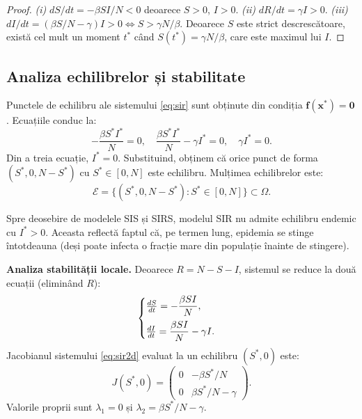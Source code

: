 \begin{proof}
\textit{(i)} $dS/dt = -\beta SI/N < 0$ deoarece $S > 0$, $I > 0$.
\textit{(ii)} $dR/dt = \gamma I > 0$.
\textit{(iii)} $dI/dt = (\beta S/N - \gamma)I > 0 \Leftrightarrow S > \gamma N/\beta$.
Deoarece $S$ este strict descrescătoare, există cel mult un moment $t^*$ când
$S(t^*) = \gamma N/\beta$, care este maximul lui $I$.
\end{proof}

\subsection{Analiza echilibrelor și stabilitate}
\label{subsec:sir_stabilitate}

Punctele de echilibru ale sistemului \eqref{eq:sir} sunt obținute din condiția
$\mathbf{f}(\mathbf{x}^*) = \mathbf{0}$. Ecuațiile conduc la:
\begin{equation}
    -\frac{\beta S^* I^*}{N} = 0, \quad
    \frac{\beta S^* I^*}{N} - \gamma I^* = 0, \quad
    \gamma I^* = 0.
\end{equation}
Din a treia ecuație, $I^* = 0$. Substituind, obținem că orice punct de forma
$(S^*, 0, N - S^*)$ cu $S^* \in [0, N]$ este echilibru. Mulțimea echilibrelor este:
\begin{equation}
    \mathcal{E} = \{(S^*, 0, N - S^*) : S^* \in [0, N]\} \subset \Omega.
\end{equation}

\begin{observatie}
Spre deosebire de modelele SIS și SIRS, modelul SIR nu admite echilibru endemic
cu $I^* > 0$. Aceasta reflectă faptul că, pe termen lung, epidemia se stinge
întotdeauna (deși poate infecta o fracție mare din populație înainte de stingere).
\end{observatie}

\textbf{Analiza stabilității locale.} Deoarece $R = N - S - I$, sistemul se reduce
la două ecuații (eliminând $R$):
\begin{equation}
\label{eq:sir2d}
\begin{cases}
    \frac{dS}{dt} = -\dfrac{\beta SI}{N}, \\[8pt]
    \frac{dI}{dt} = \dfrac{\beta SI}{N} - \gamma I.
\end{cases}
\end{equation}
Jacobianul sistemului \eqref{eq:sir2d} evaluat la un echilibru $(S^*, 0)$ este:
\begin{equation}
\label{eq:jacobian}
    J(S^*, 0) = \begin{pmatrix}
        0 & -\beta S^*/N \\
        0 & \beta S^*/N - \gamma
    \end{pmatrix}.
\end{equation}
Valorile proprii sunt $\lambda_1 = 0$ și $\lambda_2 = \beta S^*/N - \gamma$.

